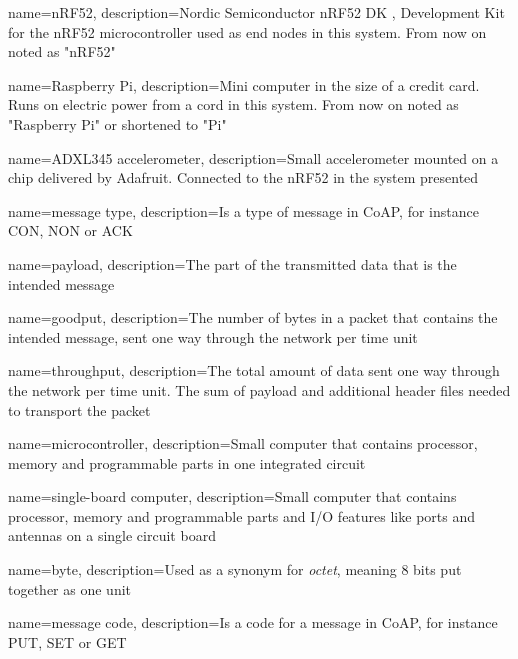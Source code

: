 \pagestyle{empty}


{
	name=nRF52,
    description={Nordic Semiconductor nRF52 DK , Development Kit for the nRF52 microcontroller used as end nodes in this system. From now on noted as "nRF52"}
}

{
	name=Raspberry Pi,
    description={Mini computer in the size of a credit card. Runs on electric power from a cord in this system. From now on noted as "Raspberry Pi" or shortened to "Pi"}
}

{
	name=ADXL345 accelerometer,
    description={Small accelerometer mounted on a chip delivered by Adafruit. Connected to the nRF52 in the system presented}
}


{
    name=message type,
    description={Is a type of message in CoAP, for instance CON, NON or ACK}
}

{
    name=payload,
    description={The part of the transmitted data that is the intended message}
}

{
	name=goodput,
	description={The number of bytes in a packet that contains the intended message, sent one way through the network per time unit}
}

{
	name=throughput,
	description={The total amount of data sent one way through the network per time unit. The sum of payload and additional header files needed to transport the packet}
}

{
    name=microcontroller,
    description={Small computer that contains processor, memory and programmable parts in one integrated circuit}
}

{
    name=single-board computer,
    description={Small computer that contains processor, memory and programmable parts and I/O features like ports and antennas on a single circuit board}
}

{
    name=byte,
    description={Used as a synonym for \textit{octet}, meaning 8 bits put together as one unit}
}

{
    name=message code,
    description={Is a code for a message in CoAP, for instance PUT, SET or GET}
}

